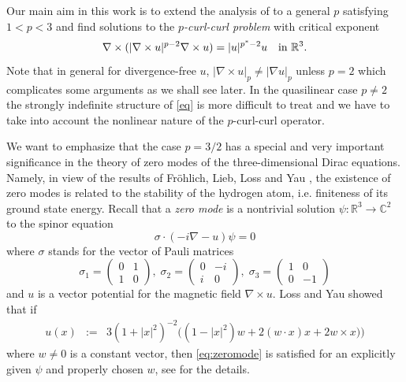 \documentclass[12pt,leqno,twoside]{amsart}
\def\R{\mathbb{R}}
\def\C{\mathbb{C}}
\def\curlop{\nabla\times}
\numberwithin{equation}{section}
\begin{document}
Our main aim in this work is to extend the analysis of \cite{FrankLoss2, MedSz} to a general $p$ satisfying $1<p<3$ and find solutions to  the {\em $p$-curl-curl problem} with critical exponent
\begin{equation}
\label{eq}
\curlop (|\curlop u|^{p-2}\curlop u)= |u|^{p^*-2}u\quad \hbox{in }\R^3.
\end{equation}
Note that in general for divergence-free $u$, $|\curlop u|_p\neq |\nabla u|_p$ unless $p=2$ which complicates some arguments as we shall see later. In the quasilinear case $p\neq 2$ the strongly indefinite structure of 
\eqref{eq}  is more difficult to treat and we have to take into account the nonlinear nature of the $p$-curl-curl operator.

We want to emphasize that the case $p=3/2$ has a special and very important significance in the theory of zero modes of the three-dimensional Dirac equations. Namely, in view of the results of Fr\"ohlich, Lieb, Loss and Yau \cite{FrolichLiebLoss,LossYau}, the existence of zero modes is related to the stability of the hydrogen atom, i.e. finiteness of its ground state energy. Recall that
 a {\em zero mode} is a  nontrivial solution $\psi:\R^3\to\C^2$ to the spinor equation
\begin{equation}\label{eq:zeromode}
\sigma \cdot (-i\nabla -u)\psi =0
\end{equation}
where $\sigma$ stands for the vector of Pauli matrices
$$\sigma_1=\begin{pmatrix}
0& 1\\
1 & 0
\end{pmatrix},\; \sigma_2=\begin{pmatrix}
0& -i\\
i & 0
\end{pmatrix},\;\sigma_3=\begin{pmatrix}
1& 0\\
0 & -1
\end{pmatrix} $$
and $u$ is a vector potential for the magnetic field $\curlop u$. Loss and Yau \cite{LossYau} showed that if
\begin{eqnarray}
u(x)&:=&3(1+|x|^2)^{-2}\big((1-|x|^2)w+2(w\cdot x)x+2w\times x)\big) \label{defu}
\end{eqnarray}
where $w\ne 0$ is a constant vector, then  \eqref{eq:zeromode} is satisfied for an explicitly given $\psi$ and properly chosen $w$, see \cite[Section II]{LossYau} for the details. 
\end{document}
